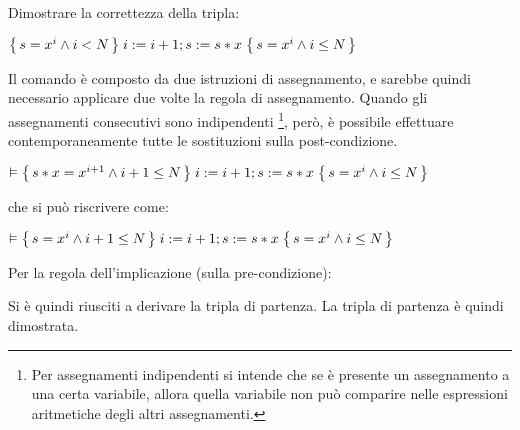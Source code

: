 \begin{exmp}
    Dimostrare la correttezza della tripla:
    \begin{center}
        $\Hoaretriple{s=x^i \land i < N}{i:=i+1; s:=s*x}{s=x^i \land i \le N}$
    \end{center}
    Il comando è composto da due istruzioni di assegnamento, e sarebbe
    quindi necessario applicare due volte la regola di assegnamento.
    Quando gli assegnamenti consecutivi sono indipendenti
    \footnote{Per assegnamenti indipendenti si intende che se è presente un
    assegnamento a una certa variabile, allora quella variabile non può
    comparire nelle espressioni aritmetiche degli altri assegnamenti.},
    però, è possibile effettuare contemporaneamente tutte le sostituzioni
    sulla post-condizione.
    \begin{center}
        $\vDash \Hoaretriple{s*x=x^{i+1} \land i+1 \le N}{i:=i+1; s:=s*x}{s=x^i \land i \le N}$
    \end{center}
    che si può riscrivere come:
    \begin{center}
        $\vDash \Hoaretriple{s=x^i \land i+1 \le N}{i:=i+1; s:=s*x}{s=x^i \land i \le N}$
    \end{center}
    Per la regola dell'implicazione (sulla pre-condizione):
    \begin{prooftree}
    \end{prooftree}
    Si è quindi riusciti a derivare la tripla di partenza. La tripla di
    partenza è quindi dimostrata.
\end{exmp}

